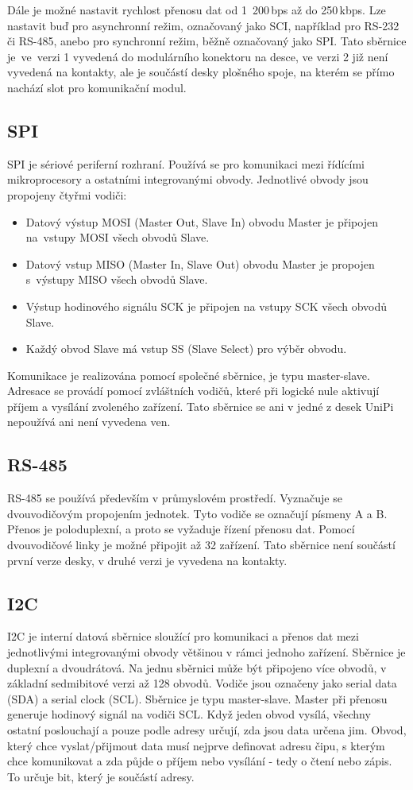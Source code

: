 Dále je možné nastavit rychlost přenosu dat od 1~200\,bps až do 250\,kbps. Lze nastavit buď pro asynchronní režim, označovaný jako SCI, například pro RS-232 či RS-485, anebo pro synchronní režim, běžně označovaný jako SPI. Tato sběrnice je~ve~verzi 1 vyvedená do modulárního konektoru na desce, ve verzi 2 již není vyvedená na kontakty, ale je součástí desky plošného spoje, na kterém se přímo nachází slot pro komunikační modul.




\subsection{SPI}
SPI je sériové periferní rozhraní. Používá se pro komunikaci mezi řídícími mikroprocesory a ostatními integrovanými obvody. Jednotlivé obvody jsou propojeny čtyřmi vodiči:
\begin{itemize}
	\item Datový výstup MOSI (Master Out, Slave In) obvodu Master je připojen na~vstupy MOSI všech obvodů Slave.
	\item Datový vstup MISO (Master In, Slave Out) obvodu Master je propojen s~výstupy MISO všech obvodů Slave.
	\item Výstup hodinového signálu SCK je připojen na vstupy SCK všech obvodů Slave.
	\item Každý obvod Slave má vstup SS (Slave Select) pro výběr obvodu.
\end{itemize}
Komunikace je realizována pomocí společné sběrnice, je typu master-slave. Adresace se provádí pomocí zvláštních vodičů, které při logické nule aktivují příjem a vysílání zvoleného zařízení. Tato sběrnice se ani v jedné z desek UniPi nepoužívá ani není vyvedena ven.

\subsection{RS-485}
RS-485 se používá především v průmyslovém prostředí. Vyznačuje se dvouvodičovým propojením jednotek. Tyto vodiče se označují písmeny A a B. Přenos je poloduplexní, a proto se vyžaduje řízení přenosu dat. Pomocí dvouvodičové linky je možné připojit až 32 zařízení. Tato sběrnice není součástí první verze desky, v druhé verzi je vyvedena na kontakty.

\subsection{I2C}
I2C je interní datová sběrnice sloužící pro komunikaci a přenos dat mezi jednotlivými integrovanými obvody většinou v rámci jednoho zařízení. Sběrnice je duplexní a dvoudrátová. Na jednu sběrnici může být připojeno více obvodů, v základní sedmibitové verzi až 128 obvodů.
Vodiče jsou označeny jako serial data (SDA) a serial clock (SCL). Sběrnice je typu master-slave. Master při přenosu generuje hodinový signál na vodiči SCL. Když jeden obvod vysílá, všechny ostatní poslouchají a pouze podle adresy určují, zda jsou data určena jim. Obvod, který chce vyslat/přijmout data musí nejprve definovat adresu čipu, s kterým chce komunikovat a zda půjde o příjem nebo vysílání - tedy o čtení nebo zápis. To určuje bit, který je součástí adresy. 

